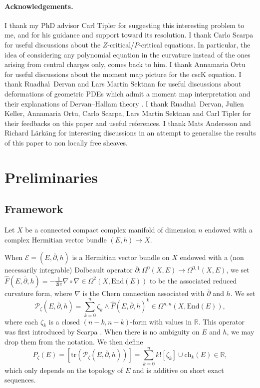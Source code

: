 \documentclass{article}
\theoremstyle{remark}
\theoremstyle{definition}
\newcommand{\R}{\mathbb{R}}
\newcommand{\End}{\mathrm{End}}
\newcommand{\tr}{\mathrm{tr}}
\let\isanspoint\i
\renewcommand{\i}{\boldsymbol{\mathrm{i}}}
\newcommand{\E}{\mathcal{E}}
\newcommand{\mP}{\mathcal{P}}
\newcommand{\dbar}{\overline{\partial}}
\newcommand{\ch}{\mathrm{ch}}
\begin{document}
\paragraph{Acknowledgements.}

I thank my PhD advisor Carl Tipler for suggesting this interesting problem to me, and for his guidance and support toward its resolution. I thank Carlo Scarpa for useful discussions about the $Z$-critical/$P$-critical equations. In particular, the idea of considering any polynomial equation in the curvature instead of the ones arising from central charges only, comes back to him. I thank Annamaria Ortu for useful discussions about the moment map picture for the cscK equation. I thank Ruadha\'\isanspoint\ Dervan and Lars Martin Sektnan for useful discussions about deformations of geometric PDEs which admit a moment map interpretation and their explanations of Dervan--Hallam theory \cite{Dervan_Hallam}. I thank Ruadha\'\isanspoint\ Dervan, Julien Keller, Annamaria Ortu, Carlo Scarpa, Lars Martin Sektnan and Carl Tipler for their feedbacks on this paper and useful references. I thank Mats Andersson and Richard Lärkäng for interesting discussions in an attempt to generalise the results of this paper to non locally free sheaves.

\section{Preliminaries}\label{SEC:Préliminaires}

\subsection{Framework}

Let $X$ be a connected compact complex manifold of dimension $n$ endowed with a complex Hermitian vector bundle $(E,h) \rightarrow X$.

When $\E = (E,\dbar,h)$ is a Hermitian vector bundle on $X$ endowed with a (non necessarily integrable) Dolbeault operator $\dbar : \Omega^0(X,E) \rightarrow \Omega^{0,1}(X,E)$, we set $\hat{F}(E,\dbar,h) = -\frac{1}{2\i\pi}\nabla \circ \nabla \in \Omega^2(X,\End(E))$ to be the associated reduced curvature form, where $\nabla$ is the Chern connection associated with $\dbar$ and $h$. We set
$$
\mP_\zeta(E,\dbar,h) = \sum_{k = 0}^n \zeta_k \wedge \hat{F}(E,\dbar,h)^k \in \Omega^{n,n}(X,\End(E)),
$$
where each $\zeta_k$ is a closed $(n - k,n - k)$-form with values in $\R$. This operator was first introduced by Scarpa \cite[Sub-section 1.1]{DNST}. When there is no ambiguity on $E$ and $h$, we may drop them from the notation. We then define
$$
P_\zeta(E) = [\tr(\mP_\zeta(E,\dbar,h))] = \sum_{k = 0}^n k![\zeta_k] \cup \ch_k(E) \in \R,
$$
which only depends on the topology of $E$ and is additive on short exact sequences.
\end{document}
